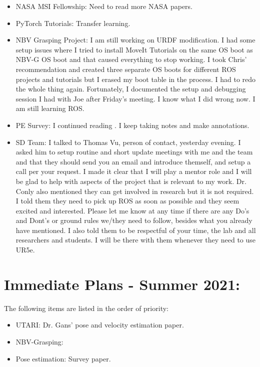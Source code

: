 \documentclass[11pt]{article}
\begin{document}
\begin{itemize}
      \item NASA MSI Fellowship: Need to read more NASA papers.
      \item PyTorch Tutorials: Transfer learning.
      \item NBV Grasping Project: I am still working on URDF modification. I had some setup issues where I tried to install MoveIt Tutorials on the same OS boot as NBV-G OS boot and that caused everything to stop working. I took Chris' recommendation and created three separate OS boots for different ROS projects and tutorials but I erased my boot table in the process. I had to redo the whole thing again. Fortunately, I documented the setup and debugging session I had with Joe after Friday's meeting. I know what I did wrong now. I am still learning ROS.
      \item PE Survey: I continued reading \cite{du2020vision}.
      I keep taking notes and make annotations.
      \item SD Team: I talked to Thomas Vu, person of contact, yesterday evening.
      I asked him to setup routine and short update meetings with me and the team and that they should send you an email and introduce themself, and setup a call per your request. I made it clear that I will play a mentor role and I will be glad to help with aspects of the project that is relevant to my work. Dr. Conly also mentioned they can get involved in research but it is not required. I told them they need to pick up ROS as soon as possible and they seem excited and interested. Please let me know at any time if there are any Do's and Dont's or ground rules we/they need to follow, besides what you already have mentioned. I also told them to be respectful of your time, the lab and all researchers and students. I will be there with them whenever they need to use UR5e.

\end{itemize}


\section{Immediate Plans - Summer 2021:}
The following items are listed in the order of priority:

\begin{itemize}
      \item UTARI: Dr. Gans' pose and velocity estimation paper.
      \item NBV-Grasping:
      \item Pose estimation: Survey paper.
\end{itemize}
\end{document}
